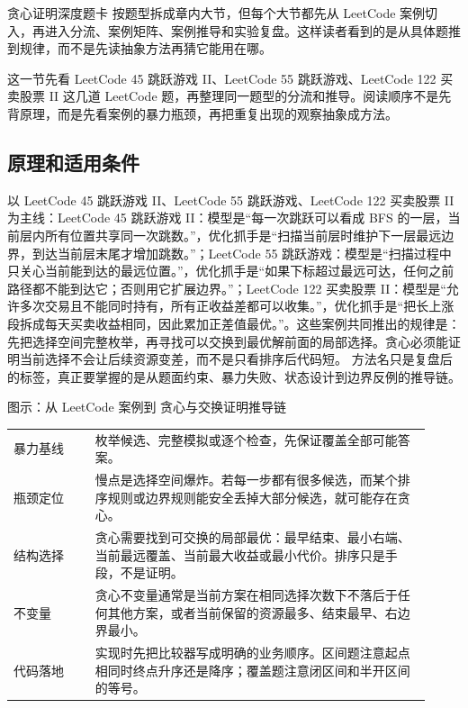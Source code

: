 贪心证明深度题卡 按题型拆成章内大节，但每个大节都先从 LeetCode 案例切入，再进入分流、案例矩阵、案例推导和实验复盘。这样读者看到的是从具体题推到规律，而不是先读抽象方法再猜它能用在哪。

这一节先看 LeetCode 45 跳跃游戏 II、LeetCode 55 跳跃游戏、LeetCode 122 买卖股票 II 这几道 LeetCode 题，再整理同一题型的分流和推导。阅读顺序不是先背原理，而是先看案例的暴力瓶颈，再把重复出现的观察抽象成方法。

\subsection{原理和适用条件}

以 LeetCode 45 跳跃游戏 II、LeetCode 55 跳跃游戏、LeetCode 122 买卖股票 II 为主线：LeetCode 45 跳跃游戏 II：模型是“每一次跳跃可以看成 BFS 的一层，当前层内所有位置共享同一次跳数。”，优化抓手是“扫描当前层时维护下一层最远边界，到达当前层末尾才增加跳数。”；LeetCode 55 跳跃游戏：模型是“扫描过程中只关心当前能到达的最远位置。”，优化抓手是“如果下标超过最远可达，任何之前路径都不能到达它；否则用它扩展边界。”；LeetCode 122 买卖股票 II：模型是“允许多次交易且不能同时持有，所有正收益差都可以收集。”，优化抓手是“把长上涨段拆成每天买卖收益相同，因此累加正差值最优。”。这些案例共同推出的规律是：先把选择空间完整枚举，再寻找可以交换到最优解前面的局部选择。贪心必须能证明当前选择不会让后续资源变差，而不是只看排序后代码短。 方法名只是复盘后的标签，真正要掌握的是从题面约束、暴力失败、状态设计到边界反例的推导链。

\begin{principlebox}{图示：从 LeetCode 案例到 贪心与交换证明推导链}
\begin{tabular}{@{}p{0.18\linewidth}p{0.74\linewidth}@{}}
暴力基线 & 枚举候选、完整模拟或逐个检查，先保证覆盖全部可能答案。\\
瓶颈定位 & 慢点是选择空间爆炸。若每一步都有很多候选，而某个排序规则或边界规则能安全丢掉大部分候选，就可能存在贪心。\\
结构选择 & 贪心需要找到可交换的局部最优：最早结束、最小右端、当前最远覆盖、当前最大收益或最小代价。排序只是手段，不是证明。\\
不变量 & 贪心不变量通常是当前方案在相同选择次数下不落后于任何其他方案，或者当前保留的资源最多、结束最早、右边界最小。\\
代码落地 & 实现时先把比较器写成明确的业务顺序。区间题注意起点相同时终点升序还是降序；覆盖题注意闭区间和半开区间的等号。\\
\end{tabular}
\end{principlebox}

